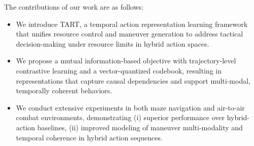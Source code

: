 The contributions of our work are as follows:

\begin{itemize}
    \item We introduce TART, a temporal action representation learning framework that unifies resource control and maneuver generation to address tactical decision-making under resource limits in hybrid action spaces.
    \item We propose a mutual information-based objective with trajectory-level contrastive learning and a vector-quantized codebook, resulting in representations that capture causal dependencies and support multi-modal, temporally coherent behaviors.
    \item We conduct extensive experiments in both maze navigation and air-to-air combat environments, demonstrating (i) superior performance over hybrid-action baselines, (ii) improved modeling of maneuver multi-modality and temporal coherence in hybrid action sequences.
\end{itemize}